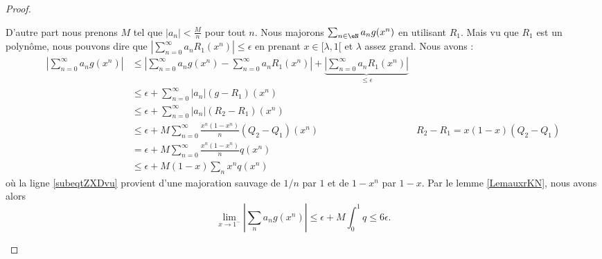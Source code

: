 \begin{proof}
\begin{subproof}
        D'autre part nous prenons \( M\) tel que \( | a_n |<\frac{ M }{ n }\) pour tout \( n\). Nous majorons \( \sum_{n \in \eN}a_ng(x^n)\) en utilisant \( R_1\). Mais vu que \( R_1\) est un polynôme, nous pouvons dire que \( | \sum_{n=0}^{\infty}a_nR_1(x^n) |\leq \epsilon\) en prenant \( x\in\mathopen[ \lambda , 1 [\) et \( \lambda\) assez grand. Nous avons :
        \begin{subequations}
            \begin{align}
                \left| \sum_{n=0}^{\infty}a_ng(x^n) \right| &\leq\left| \sum_{n=0}^{\infty}a_ng(x^n)-\sum_{n=0}^{\infty}a_nR_1(x^n) \right| +\underbrace{\left| \sum_{n=0}^{\infty}a_nR_1(x^n) \right|}_{\leq \epsilon} \\
                &\leq \epsilon+\sum_{n=0}^{\infty}| a_n |(g-R_1)(x^n)\\
                &\leq \epsilon+\sum_{n=0}^{\infty}| a_n |(R_2-R_1)(x^n)\\
                &\leq \epsilon+M\sum_{n=0}^{\infty}\frac{ x^n(1-x^n) }{ n }(Q_2-Q_1)(x^n)   &R_2-R_1=x(1-x)(Q_2-Q_1)\\
                &=\epsilon+M\sum_{n=0}^{\infty}\frac{ x^n(1-x^n) }{ n }q(x^n)\\
                &\leq \epsilon+M(1-x)\sum_nx^nq(x^n)   \label{subeqtZXDvu} 
            \end{align}
        \end{subequations}
        où la ligne \eqref{subeqtZXDvu} provient d'une majoration sauvage de \( 1/n\) par \( 1\) et de \( 1-x^n\) par \( 1-x\). Par le lemme \ref{LemauxrKN}, nous avons alors
        \begin{equation}
            \lim_{x\to 1^-} | \sum_na_ng(x^n) |\leq \epsilon+M\int_0^1q\leq 6\epsilon.
        \end{equation}
    \end{subproof}
\end{proof}

